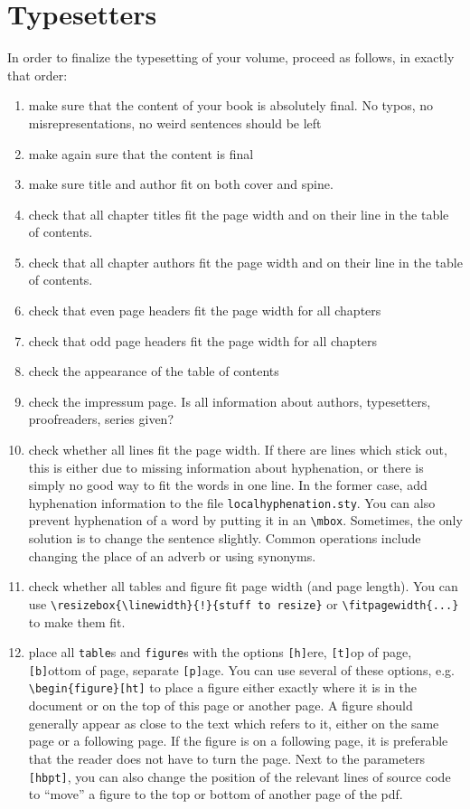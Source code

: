 \chapter{Typesetters}
In order to finalize the typesetting of your volume, proceed as follows, in exactly that order:

\begin{enumerate}
 \item make sure that the content of your book is absolutely final. No typos, no misrepresentations, no weird sentences should be left
 \item make again sure that the content is final 
 \item make sure title and author fit on both cover and spine. 
 \item check that all chapter titles fit the page width and on their line in the table of contents. 
 \item check that all chapter authors fit the page width and on their line in the table of contents. 
 \item check that even page headers fit the page width for all chapters
 \item check that odd page headers fit the page width for all chapters
 \item check the appearance of the table of contents
 \item check the impressum page. Is all information about authors, typesetters, proofreaders, series given?
 \item check whether all lines fit the page width. If there are lines which stick out, this is either due to missing information about hyphenation, or there is simply no good way to fit the words in one line. In the former case, add hyphenation information to the file \verb+localhyphenation.sty+. You can also prevent hyphenation of a word by putting it in an \verb+\mbox+. Sometimes, the only solution is to change the sentence slightly. Common operations include changing the place of an adverb or using synonyms.
 \item check whether all tables and figure fit page width (and page length). You can use \verb+\resizebox{\linewidth}{!}{stuff to resize}+ or \verb+\fitpagewidth{...}+  to make them fit.
 \item place all \verb+table+s and \verb+figure+s with the options 
\texttt{[h]}ere, 
\texttt{[t]}op of page, 
\texttt{[b]}ottom of page,
separate \texttt{[p]}age. You can use several of these options, e.g. \verb+\begin{figure}[ht]+ to place a figure either exactly where it is in the document or on the top of this page or another page.  A figure should generally appear as close to the text which refers to it, either on the same page or a following page. If the figure is on a following page, it is preferable that the reader does not have to turn the page. Next to the parameters \verb+[hbpt]+, you can also change the position of the relevant lines of source code to ``move'' a figure to the top or bottom of another page of the pdf. 

\end{enumerate}

